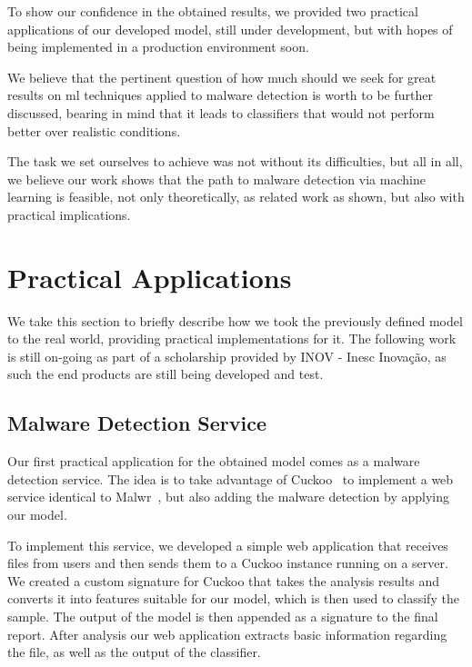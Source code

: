 To show our confidence in the obtained results, we provided two practical applications of our developed model, still under development, but with hopes of being implemented in a production environment soon.

We believe that the pertinent question of how much should we seek for great results on \gls{ml} techniques applied to malware detection is worth to be further discussed, bearing in mind that it leads to classifiers that would not perform better over realistic conditions.

The task we set ourselves to achieve was not without its difficulties, but all in all, we believe our work shows that the path to malware detection via machine learning is feasible, not only theoretically, as related work as shown, but also with practical implications.




\section{Practical Applications}
\label{section:practical_applications}

We take this section to briefly describe how we took the previously defined model to the real world, providing practical implementations for it.
The following work is still on-going as part of a scholarship provided by INOV - Inesc Inovação, as such the end products are still being developed and test.

\subsection{Malware Detection Service}
\label{section:malware_service}

Our first practical application for the obtained model comes as a malware detection service.
The idea is to take advantage of Cuckoo~\cite{tool:cuckoo} to implement a web service identical to Malwr~\cite{tool:malwr}, but also adding the malware detection by applying our model.

To implement this service, we developed a simple web application that receives files from users and then sends them to a Cuckoo instance running on a server.
We created a custom signature for Cuckoo that takes the analysis results and converts it into features suitable for our model, which is then used to classify the sample.
The output of the model is then appended as a signature to the final report.
After analysis our web application extracts basic information regarding the file, as well as the output of the classifier.

